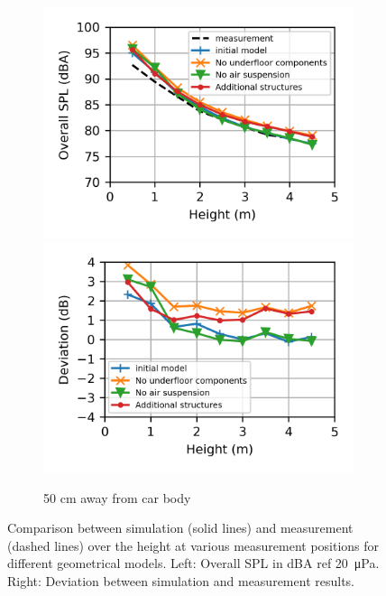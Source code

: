 \begin{figure}[H]
\begin{subfigure}[b]{\textwidth}
		\includegraphics{fig/chap5/geometry_variation/overall_SPL/pos_f.png}
		\hfill
		\includegraphics{fig/chap5/geometry_variation/overall_SPL/pos_f_deviation.png}
		\caption{50 cm away from car body}
	\end{subfigure}
	\caption{Comparison between simulation (solid lines) and measurement (dashed lines) over the height at various measurement positions for different geometrical models. Left: Overall SPL in dBA ref \SI{20}{\micro\pascal}. Right: Deviation between simulation and measurement results.}
	\label{fig:overall_SPL_geometry}
\end{figure}

